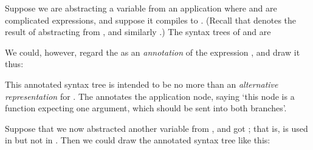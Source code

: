 Suppose we are abstracting a variable  from an application  where  and  are complicated expressions, and suppose it compiles to . (Recall that  denotes the result of abstracting  from , and similarly .) The syntax trees of  and  are

\begin{center}
    \raisebox{-\height}{%
        \begin{forest}
            [\ml{@}
            [\ml{p}]
            [\ml{q}]
            ]
        \end{forest}%
    }%
    \hspace{2cm}%
\end{center}

\noindent
We could, however, regard the  as an \textit{annotation} of the expression , and draw it thus:

\begin{center}
    \hspace{2cm}%
\end{center}

\noindent
This annotated syntax tree is intended to be no more than an \textit{alternative representation} for . The  annotates the application node, saying `this node is a function expecting one argument, which should be sent into both branches'.

Suppose that we now abstracted another variable  from , and got ; that is,  is used in  but not in . Then we could draw the annotated syntax tree like this:

\begin{center}
    \hspace{2cm}%
\end{center}

